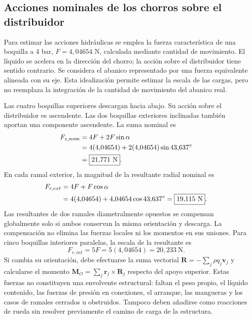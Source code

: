 \ifdefined\AspersionSoloResultados
\else
\subsection{Acciones nominales de los chorros sobre el distribuidor}
\label{sec:man-asp-reacciones}

Para estimar las acciones hidráulicas se emplea la fuerza característica
de una boquilla a 4 bar, $F=4{,}04654$ N, calculada mediante cantidad de
movimiento. El líquido se acelera en la dirección del chorro; la acción
sobre el distribuidor tiene sentido contrario. Se considera el abanico
representado por una fuerza equivalente alineada con su eje. Esta
idealización permite estimar la escala de las cargas, pero no reemplaza
la integración de la cantidad de movimiento del abanico real.

Las cuatro boquillas superiores descargan hacia abajo. Su acción sobre
el distribuidor es ascendente. Las dos boquillas exteriores inclinadas
también aportan una componente ascendente. La suma nominal es
\begin{align}
 F_{z,nom}&=4F+2F\sin\alpha\notag\\
 &=4(4{,}04654)+2(4{,}04654)\sin43{,}637^\circ\notag\\
 &=\boxed{21{,}771\ \mathrm{N}}.
 \label{eq:man-asp-fz}
\end{align}
En cada ramal exterior, la magnitud de la resultante radial nominal es
\begin{align}
 F_{r,ext}&=4F+F\cos\alpha\notag\\
 &=4(4{,}04654)+4{,}04654\cos43{,}637^\circ
 =\boxed{19{,}115\ \mathrm{N}}.
\end{align}
Las resultantes de dos ramales diametralmente opuestos se compensan
globalmente solo si ambos conservan la misma orientación y descarga.
La compensación no elimina las fuerzas locales ni los momentos en sus
uniones. Para cinco boquillas interiores paralelas, la escala de la
resultante es
\begin{equation}
 F_{r,int}=5F=5(4{,}04654)=20{,}233\ \mathrm{N}.
\end{equation}
Si cambia su orientación, debe efectuarse la suma vectorial
$\boldsymbol{R}=-\sum_j\rho q_j\boldsymbol{v}_j$ y calcularse el momento
$\boldsymbol{M}_O=\sum_j\boldsymbol{r}_j\times\boldsymbol{R}_j$ respecto
del apoyo superior. Estas fuerzas no constituyen una envolvente
estructural: faltan el peso propio, el líquido contenido, las fuerzas
de presión en conexiones, el arranque, las mangueras y los casos de
ramales cerrados u obstruidos. Tampoco deben añadirse como reacciones
de rueda sin resolver previamente el camino de carga de la estructura.

